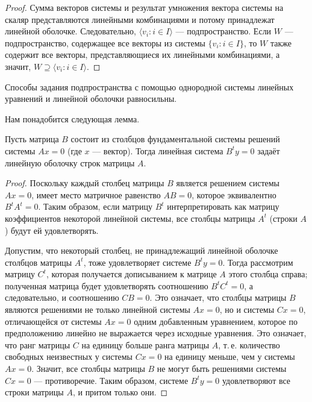 \begin{proof}
    Сумма векторов системы и результат умножения вектора системы на скаляр представляются линейными комбинациями и потому принадлежат линейной оболочке. Следовательно, $\langle v_i : i \in I\rangle$ --- подпространство. Если $W$ --- подпространство, содержащее все векторы из системы $\{v_i : i \in I\}$, то $W$ также содержит все векторы, представляющиеся их линейными комбинациями, а значит, $W \supseteq \langle v_i : i \in I\rangle$.
\end{proof}

\begin{theorem}
    Способы задания подпространства с помощью однородной системы линейных уравнений и линейной оболочки равносильны.
\end{theorem}

Нам понадобится следующая лемма.

\begin{lemma}
    Пусть матрица $B$ состоит из столбцов фундаментальной системы решений системы $Ax = 0$ (где $x$ --- вектор). Тогда линейная система $B^ty = 0$ задаёт линейную оболочку строк матрицы $A$.
\end{lemma}

\begin{proof}
    Поскольку каждый столбец матрицы $B$ является решением системы $Ax = 0$, имеет место матричное равенство $AB = 0$, которое эквивалентно $B^tA^t = 0$. Таким образом, если матрицу $B^t$ интерпретировать как матрицу коэффициентов некоторой линейной системы, все столбцы матрицы $A^t$ (строки $A$) будут ей удовлетворять.

    Допустим, что некоторый столбец, не принадлежащий линейной оболочке столбцов матрицы $A^t$, тоже удовлетворяет системе $B^ty = 0$. Тогда рассмотрим матрицу $C^t$, которая получается дописыванием к матрице $A$ этого столбца справа; полученная матрица будет удовлетворять соотношению $B^tC^t = 0$, а следовательно, и соотношению $CB = 0$. Это означает, что столбцы матрицы $B$ являются решениями не только линейной системы $Ax = 0$, но и системы $Cx = 0$, отличающейся от системы $Ax = 0$ одним добавленным уравнением, которое по предположению линейно не выражается через исходные уравнения. Это означает, что ранг матрицы $C$ на единицу больше ранга матрицы $A$, т.\,е. количество свободных неизвестных у системы $Cx = 0$ на единицу меньше, чем у системы $Ax = 0$. Значит, все столбцы матрицы $B$ не могут быть решениями системы $Cx = 0$ --- противоречие. Таким образом, системе $B^ty = 0$ удовлетворяют все строки матрицы $A$, и притом только они.
\end{proof}

